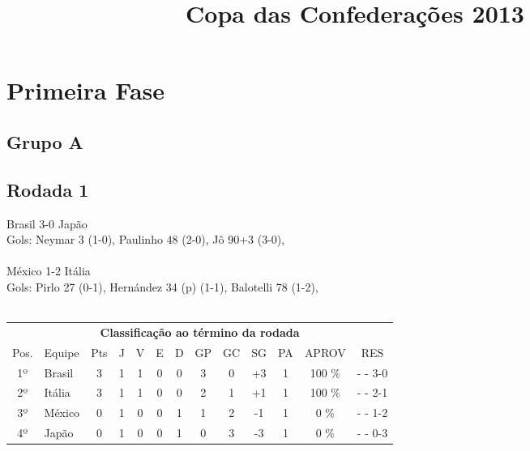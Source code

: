 \documentclass{article}
\title{\textbf{Copa das Confederações 2013}}
\author{}
\date{}
\begin{document}
\maketitle

\section*{Primeira Fase}
\subsection*{Grupo A}
\subsection*{Rodada 1}
Brasil 3-0 Japão\\
Gols: Neymar  3 (1-0), Paulinho  48 (2-0), Jô  90+3 (3-0), \\
\\
México 1-2 Itália\\
Gols: Pirlo  27 (0-1), Hernández  34 (p) (1-1), Balotelli  78 (1-2), \\
\\
\begin{center}
\begin{tabular}{| c | l | c | c | c | c | c | c | c | c | c | c | c |}
\multicolumn{13}{c}{\textbf{Classificação ao término da rodada}}\\
Pos.&Equipe&Pts&J&V&E&D&GP&GC&SG&PA&APROV&RES\\
1º&Brasil              &3&1	&1&0&0	&3&0&+3	&1&100 \%	& -  - 3-0 \\
2º&Itália              &3&1	&1&0&0	&2&1&+1	&1&100 \%	& -  - 2-1 \\
3º&México              &0&1	&0&0&1	&1&2&-1	&1&  0 \%	& -  - 1-2 \\
4º&Japão               &0&1	&0&0&1	&0&3&-3	&1&  0 \%	& -  - 0-3 \\
\end{tabular}
\end{center}
\end{document}
